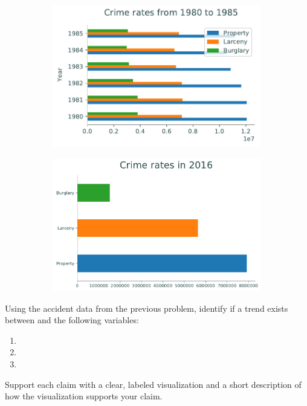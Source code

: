 \begin{figure}[H] %
\captionsetup[subfigure]{justification=centering}
\centering
\begin{subfigure}{.49\textwidth}
    \includegraphics[width=\textwidth]{figures/bar_multi.pdf}
\end{subfigure}
%
\begin{subfigure}{.49\textwidth}
    \includegraphics[width=\textwidth]{figures/bar_single.pdf}
\end{subfigure}
\end{figure}

\begin{problem}
Using the accident data from the previous problem, identify if a trend exists between  and the following variables:
\begin{enumerate}
\item {}
\item {}
\item {}
\end{enumerate}

Support each claim with a clear, labeled visualization and a short description of how the visualization supports your claim.
\end{problem}

